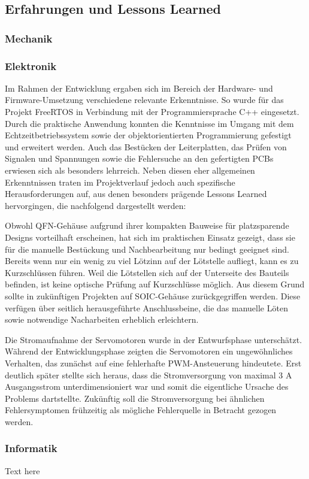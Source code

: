\documentclass[main.tex]{subfiles} %
\begin{document}

\subsection{Erfahrungen und Lessons Learned}

\subsubsection{Mechanik}

\subsubsection{Elektronik}
Im Rahmen der Entwicklung ergaben sich im Bereich der Hardware- und Firmware-Umsetzung verschiedene relevante
Erkenntnisse. So wurde für das Projekt FreeRTOS in Verbindung mit der Programmiersprache C++ eingesetzt. Durch
die praktische Anwendung konnten die Kenntnisse im Umgang mit dem Echtzeitbetriebssystem sowie der objektorientierten
Programmierung gefestigt und erweitert werden. Auch das Bestücken der Leiterplatten, das Prüfen von Signalen
und Spannungen sowie die Fehlersuche an den gefertigten PCBs erwiesen sich als besonders lehrreich.
Neben diesen eher allgemeinen Erkenntnissen traten im Projektverlauf jedoch auch spezifische Herausforderungen auf,
aus denen besonders prägende Lessons Learned hervorgingen, die nachfolgend dargestellt werden:

Obwohl QFN-Gehäuse aufgrund ihrer kompakten Bauweise für platzsparende Designs
vorteilhaft erscheinen, hat sich im praktischen Einsatz gezeigt, dass sie für die manuelle Bestückung
und Nachbearbeitung nur bedingt geeignet sind. Bereits wenn nur ein wenig zu viel Lötzinn auf der
Lötstelle aufliegt, kann es zu Kurzschlüssen führen. Weil die Lötstellen sich auf der Unterseite des
Bauteils befinden, ist keine optische Prüfung auf Kurzschlüsse möglich. Aus diesem Grund sollte in
zukünftigen Projekten auf SOIC-Gehäuse zurückgegriffen werden. Diese verfügen über
seitlich herausgeführte Anschlussbeine, die das manuelle Löten sowie
notwendige Nacharbeiten erheblich erleichtern.

Die Stromaufnahme der Servomotoren wurde in der Entwurfsphase unterschätzt.
Während der Entwicklungsphase zeigten die Servomotoren ein ungewöhnliches Verhalten, das zunächst auf eine
fehlerhafte PWM-Ansteuerung hindeutete. Erst deutlich später stellte sich heraus, dass die Stromversorgung von
maximal 3 A Ausgangsstrom unterdimensioniert war und somit die eigentliche Ursache des Problems dartstellte.
Zukünftig soll die Stromversorgung bei ähnlichen Fehlersymptomen frühzeitig als mögliche Fehlerquelle in Betracht
gezogen werden.



\subsubsection{Informatik}

Text here
\end{document}
